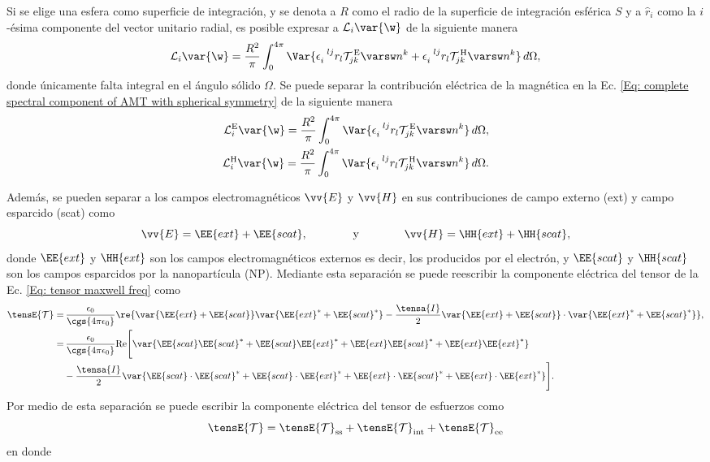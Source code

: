 Si se elige una esfera como superficie de integración, y se denota a $R$ como el radio de la superficie de integración esférica $S$ y a $\hat{r}_i$ como la $i$-ésima componente del vector unitario radial, es posible expresar a $\mathcal{L}_i \var{\w}$ de la siguiente manera
\begin{equation}
\mathcal{L}_i\var{\w} = \frac{R^2}{\pi} \int_0^{4\pi} \Var{\epsilon_{i}^{\,\,\,\, lj} r_l \mathcal{T}^{\, \rm E}_{jk}\varsw n^k + \epsilon_{i}^{\,\,\,\, lj} r_l \mathcal{T}^{\, \rm H}_{jk}\varsw n^k}\,d\Omega,
\label{Eq: complete spectral component of AMT with spherical symmetry}
\end{equation}
donde únicamente falta integral en el ángulo sólido $\Omega$. Se puede separar la contribución eléctrica de la magnética en la Ec. \eqref{Eq: complete spectral component of AMT with spherical symmetry} de la siguiente manera
\begin{align}
\mathcal{L}_i^{\rm E}\var{\w} = \frac{R^2}{\pi} \int_0^{4\pi} \Var{\epsilon_{i}^{\,\,\,\, lj} r_l \mathcal{T}^{\,\rm E}_{jk}\varsw n^k}\,d\Omega, \\
\mathcal{L}_i^{\rm H}\var{\w} = \frac{R^2}{\pi} \int_0^{4\pi} \Var{\epsilon_{i}^{\,\,\,\, lj} r_l \mathcal{T}^{\,\rm H}_{jk}\varsw n^k}\,d\Omega.
\end{align}

Además, se pueden separar a los campos electromagnéticos $\vv{E}$ y $\vv{H}$ en sus contribuciones de campo externo (ext) y campo esparcido (scat) como 
\begin{equation}
\vv{E} = \EE{ext} + \EE{scat}, \qquad\qquad \text{y} \qquad\qquad \vv{H} = \HH{ext} + \HH{scat},
\end{equation}
donde $\EE{ext}$ y $\HH{ext}$ son los campos electromagnéticos externos \textemdash es decir, los producidos por el electrón\textemdash, y $\EE{scat}$ y $\HH{scat}$ son los campos esparcidos por la nanopartícula (NP). Mediante esta separación se puede reescribir la componente eléctrica del tensor de la Ec. \eqref{Eq: tensor maxwell freq} como
\begin{align}
\tensE{\mathcal{T}}=&\,\frac{\epsilon_0}{\cgs{4\pi\epsilon_0}} \re{ \var{\EE{ext}+\EE{scat}}\var{\EE{ext}^{*}+\EE{scat}^{*}}-\frac{\tensa{I}}{2}\var{\EE{ext}+\EE{scat}}\cdot\var{\EE{ext}^{*}+\EE{scat}^{*}} },\nonumber \\
=& \, \frac{\epsilon_0}{\cgs{4\pi\epsilon_0}} {\rm Re} \Bigg[\var{\EE{scat}\EE{scat}^{*}+\EE{scat}\EE{ext}^{*}+\EE{ext}\EE{scat}^{*}+\EE{ext}\EE{ext}^{*}}\nonumber \\
&-\frac{\tensa{I}}{2}\var{\EE{scat}\cdot\EE{scat}^{*}+\EE{scat}\cdot\EE{ext}^{*}+\EE{ext}\cdot\EE{scat}^{*}+\EE{ext}\cdot\EE{ext}^{*}} \Bigg].
\label{eq: tensor de esfuerzos inicio}
\end{align}
Por medio de esta separación se puede escribir la componente eléctrica del tensor de esfuerzos como
\begin{equation}
\tensE{\mathcal{T}}=\tensE{\mathcal{T}}_{\rm ss}+\tensE{\mathcal{T}}_{\rm int}+\tensE{\mathcal{T}}_{\rm ee}
\end{equation}
en donde

